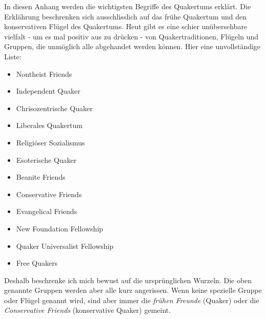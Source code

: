 
In diesen Anhang werden die wichtigsten Begriffe des Quakertums erklärt. Die Erklährung beschrenken sich ausschlisslich auf das frühe Quakertum und den konservativen Flügel des Quakertums. Heut gibt es eine schier unübersehbare vielfalt - um es mal positiv aus zu drücken - von Quakertraditionen, Flügeln und Gruppen, die unmöglich alle abgehandet werden können. Hier eine unvollständige Liste:

\begin{itemize}
\item Nontheist Friends
\item Independent Quaker
\item Chrisozentrische Quaker
\item Liberales Quakertum
\item Religiöser Sozialismus
\item Esoterische Quaker
\item Beanite Friends
\item Conservative Friends
\item Evangelical Friends 
\item New Foundation Fellowship
\item Quaker Universalist Fellowship
\item Free Quakers
\end{itemize}

Deshalb beschrenke ich mich bewust auf die ursprünglichen Wurzeln. Die oben genannte Gruppen werden aber alle kurz angerissen. Wenn keine spezielle Gruppe oder Flügel genannt wird, sind aber immer die \textit{frühen Freunde} (Quaker) oder die \textit{Conservative Friends} (konservative Quaker) gemeint.


\newcommand{\articlesize}{\footnotesize}

\twocolumn




























\onecolumn

\theendnotes


\null\newpage